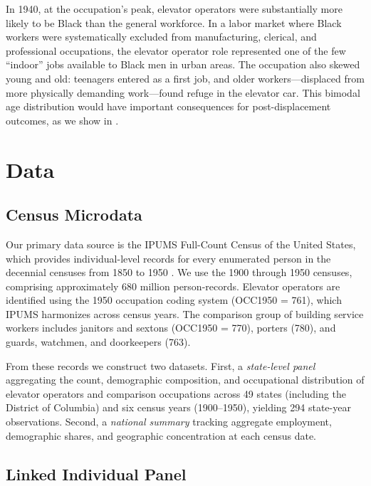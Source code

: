 \documentclass[12pt]{article}
\begin{document}
In 1940, at the occupation's peak, elevator operators were substantially more likely to be Black than the general workforce. In a labor market where Black workers were systematically excluded from manufacturing, clerical, and professional occupations, the elevator operator role represented one of the few ``indoor'' jobs available to Black men in urban areas. The occupation also skewed young and old: teenagers entered as a first job, and older workers---displaced from more physically demanding work---found refuge in the elevator car. This bimodal age distribution would have important consequences for post-displacement outcomes, as we show in .



\section{Data} \label{sec:data}

\subsection{Census Microdata}

Our primary data source is the IPUMS Full-Count Census of the United States, which provides individual-level records for every enumerated person in the decennial censuses from 1850 to 1950 \citep{ruggles2024}. We use the 1900 through 1950 censuses, comprising approximately 680 million person-records. Elevator operators are identified using the 1950 occupation coding system (OCC1950 = 761), which IPUMS harmonizes across census years. The comparison group of building service workers includes janitors and sextons (OCC1950 = 770), porters (780), and guards, watchmen, and doorkeepers (763).

From these records we construct two datasets. First, a \emph{state-level panel} aggregating the count, demographic composition, and occupational distribution of elevator operators and comparison occupations across 49 states (including the District of Columbia) and six census years (1900--1950), yielding 294 state-year observations. Second, a \emph{national summary} tracking aggregate employment, demographic shares, and geographic concentration at each census date.

\subsection{Linked Individual Panel}
\end{document}
